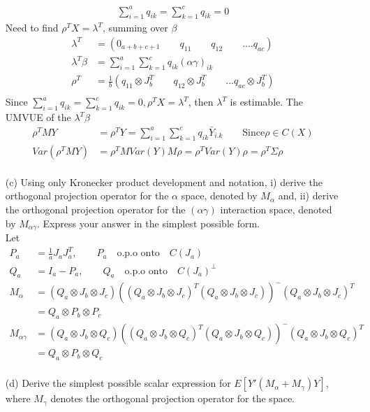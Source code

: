 \documentclass{homework}
\begin{document}
\begin{itemize}
\begin{align*}
\sum_{i=1}^{a} q_{ik} = \sum_{k=1}^{c} q_{ik} =0
\end{align*} 
Need to find $\rho^T X = \lambda^T$, summing over $\beta$
\begin{align*}
\lambda^T &= (0_{a+b+c+1} \qquad q_{11} \qquad q_{12} \qquad .... q_{ac})\\
\lambda^T \beta &= \sum_{i=1}^{a} \sum_{k=1}^{c} q_{ik}(\alpha\gamma)_{ik}\\
\rho^T &= \frac{1}{b} (q_{11} \otimes J_b^T \qquad q_{12}  \otimes J_b^T \qquad ... q_{ac} \otimes J_b^T)\\
\end{align*} 
Since $\sum_{i=1}^{a} q_{ik} = \sum_{k=1}^{c} q_{ik} =0, \rho^T X = \lambda^T $, then $\lambda^T $ is estimable. 
The UMVUE of the $\lambda^T \beta$
\begin{align*}
\rho^T MY &= \rho^T Y = \sum_{i=1}^{a} \sum_{k=1}^{c} q_{ik} \bar{Y}_{i.k} \qquad \text{Since} \rho \in C(X)\\
Var(\rho^T MY) &= \rho^T M Var(Y)  M\rho = \rho^T Var(Y) \rho = \rho^T \Sigma \rho\\
\end{align*} 
\item[(c)] Using only Kronecker product development and notation, i) derive the orthogonal projection operator for the $\alpha$ space, denoted by $M_{\alpha}$ and, ii) derive the orthogonal
projection operator for the $(\alpha\gamma)$ interaction space, denoted by $M_{\alpha\gamma}$. Express your answer in the simplest possible form.\\
Let
\begin{align*}
P_a &= \frac{1}{a} J_a J_a^T, \qquad P_a \quad \text{o.p.o onto}\quad C(J_a)\\
Q_a &= I_a - P_a, \qquad Q_a \quad \text{o.p.o onto}\quad C(J_a)^{\perp}\\
M_{\alpha} &= (Q_a \otimes J_b \otimes J_c)\left ((Q_a \otimes J_b \otimes J_c)^T (Q_a \otimes J_b \otimes J_c) \right)^{-} (Q_a \otimes J_b \otimes J_c)^T\\
&= Q_a \otimes P_b \otimes P_c\\
M_{\alpha\gamma} &= (Q_a \otimes J_b \otimes Q_c) \left ((Q_a \otimes J_b \otimes Q_c)^T (Q_a \otimes J_b \otimes Q_c) \right)^{-} (Q_a \otimes J_b \otimes Q_c)^T\\
&= Q_a \otimes P_b \otimes Q_c\\
\end{align*} 
\item[(d)]Derive the simplest possible scalar expression for $E[Y'(M_{\alpha} + M_{\gamma})Y]$, where $M_{\gamma}$ denotes the orthogonal projection operator for the space.\\

\end{itemize}
\end{document}
